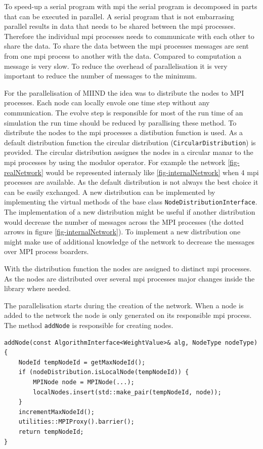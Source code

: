 \documentclass[12pt]{article}
\begin{document}
To speed-up a serial program with mpi the serial program is decomposed in parts that can be executed in parallel.
A serial program that is not embarrasing parallel results in data that needs to be shared between the mpi processes.
Therefore the individual mpi processes needs to communicate with each other to share the data.
To share the data between the mpi processes messages are sent from one mpi process to another with the data.
Compared to computation a message is very slow.
To reduce the overhead of parallelisation it is very important to reduce the number of messages to the minimum.


For the parallelisation of MIIND the idea was to distribute the nodes to MPI processes.
Each node can locally envole one time step without any communication.
The evolve step is responsible for most of the run time of an simulation the run time should be reduced by parallising these method.
To distribute the nodes to the mpi processes a distibution function is used.
As a default distribution function the circular distribution (\texttt{CircularDistribution}) is provided.
The circular distribution assignes the nodes in a circular manar to the mpi processes by using the modulor operator.
For example the network \ref{fig-realNetwork} would be represented internaly like \ref{fig-internalNetwork} when 4 mpi processes are available.
As the default distribution is not always the best choice it can be easily exchanged.
A new distribution can be implemented by implementing the virtual methods of the base class \texttt{NodeDistributionInterface}.
The implementation of a new distribution might be useful if another distribution would decrease the number of messages across the MPI processes (the dotted arrows in figure \ref{fig-internalNetwork}).
To implement a new distribution one might make use of additional knowledge of the network to decrease the messages over MPI process boarders.

With the distribution function the nodes are assigned to distinct mpi processes.
As the nodes are distributed over several mpi processes major changes inside the library where needed.

The parallelisation starts during the creation of the network.
When a node is added to the network the node is only generated on its responsible mpi process.
The method \texttt{addNode} is responsible for creating nodes.

\begin{lstlisting}[caption=The \texttt{addNode} method of the network.,label=code:addNode]
addNode(const AlgorithmInterface<WeightValue>& alg, NodeType nodeType) {
	NodeId tempNodeId = getMaxNodeId();
	if (nodeDistribution.isLocalNode(tempNodeId)) {
		MPINode node = MPINode(...);
		localNodes.insert(std::make_pair(tempNodeId, node));
	}
	incrementMaxNodeId();
	utilities::MPIProxy().barrier();
	return tempNodeId;
}
\end{lstlisting}
\end{document}
